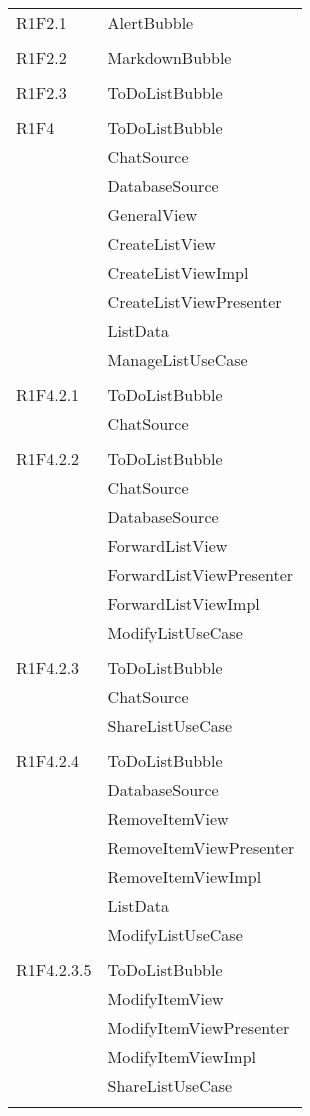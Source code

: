 \begin{center}
\begin{longtable}{|p{7cm}|p{7cm}|}
		R1F2.1 & AlertBubble \\ & \\ \hline
		R1F2.2 & MarkdownBubble \\ & \\ \hline
		R1F2.3 & ToDoListBubble \\ & \\ \hline
		R1F4 & ToDoListBubble \\ & ChatSource \\ & DatabaseSource \\ & GeneralView \\ & CreateListView \\ & CreateListViewImpl \\ & CreateListViewPresenter \\ & ListData \\ & ManageListUseCase \\ & \\ \hline
		R1F4.2.1 & ToDoListBubble \\ & ChatSource \\ & \\ \hline
		R1F4.2.2 & ToDoListBubble \\ & ChatSource \\ & DatabaseSource \\ & ForwardListView \\ & ForwardListViewPresenter \\ & ForwardListViewImpl \\ & ModifyListUseCase \\ & \\ \hline
		R1F4.2.3 & ToDoListBubble \\ & ChatSource \\ & ShareListUseCase \\ & \\ \hline
		R1F4.2.4 & ToDoListBubble \\ & DatabaseSource \\ & RemoveItemView \\ & RemoveItemViewPresenter \\ & RemoveItemViewImpl \\ & ListData \\ & ModifyListUseCase \\ & \\ \hline
		R1F4.2.3.5 & ToDoListBubble \\ & ModifyItemView \\ & ModifyItemViewPresenter \\ & ModifyItemViewImpl \\ & ShareListUseCase \\ & \\ \hline

\end{longtable}
\end{center}
